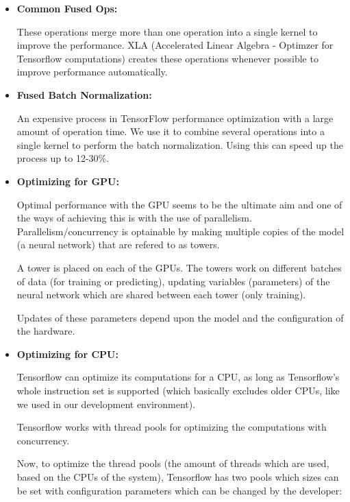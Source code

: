 \begin{itemize}[label={}]

  \item \textbf{Common Fused Ops:}

        These operations merge more than one operation
        into a single kernel to improve the performance.
        XLA (Accelerated Linear Algebra - Optimzer for
        Tensorflow computations) creates these operations
        whenever possible to improve performance
        automatically.

  \item \textbf{Fused Batch Normalization:}

        An expensive process in TensorFlow performance
        optimization with a large amount of operation time.
        We use it to combine several operations into a
        single kernel to perform the batch normalization.
        Using this can speed up the process up to 12-30\%.
        \cite{david3}


  \item \textbf{Optimizing for GPU:}

        Optimal performance with the GPU seems to be the
        ultimate aim and one of the ways of achieving this
        is with the use of parallelism.
        Parallelism/concurrency is optainable by making
        multiple copies of the model (a neural network)
        that are refered to as towers.

        A tower is placed on each of the GPUs. The towers
        work on different batches of data (for training or
        predicting), updating variables (parameters) of
        the neural network which are shared between each
        tower (only training).

        Updates of these parameters depend upon the model
        and the configuration of the hardware.

  \item \textbf{Optimizing for CPU:}

        Tensorflow can optimize its computations for a CPU,
        as long as Tensorflow's whole instruction set is
        supported (which basically excludes older CPUs,
        like we used in our development environment).

        Tensorflow works with thread pools for optimizing
        the computations with concurrency.

        Now, to optimize the thread pools (the amount of
        threads which are used, based on the CPUs of the
        system), Tensorflow has two pools which sizes
        can be set with configuration parameters which can
        be changed by the developer\cite{tf_op}:


\end{itemize}
